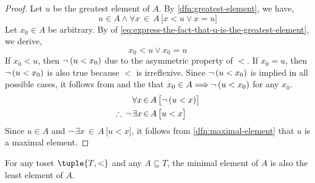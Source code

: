 \begin{proof}
    Let \( u \) be the greatest element of \( A \). By \cref{dfn:greatest-element}, we have,
    \begin{equation}
        \label{eq:express-the-fact-that-u-is-the-greatest-element}
        u \in A \land \forall x\,{\in}\,A \, \big[ x < u \lor x = u \big]
    \end{equation}
    Let \( x_{0} \in A \) be arbitrary. By  of \eqref{eq:express-the-fact-that-u-is-the-greatest-element}, we derive,
    \begin{equation*}
        x_{0} < u \lor x_{0} = u
    \end{equation*}
    If \( x_{0} < u \), then \( \lnot \, \mleft( u < x_{0} \mright) \) due to the asymmetric property of \( < \). If \( x_{0} = u \), then
    \( \lnot \, \mleft( u < x_{0} \mright) \) is also true because \( < \) is irreflexive. Since \( \lnot \, \mleft( u < x_{0} \mright) \)
    is implied in all possible cases, it follows from  and the  that
    \( x_{0} \in A {\implies} \lnot \, \mleft( u < x_{0} \mright) \) for any \( x_{0} \).
    \begin{align*}
        &\forall x\,{\in}\,A \, \big[ \lnot \, \mleft( u < x \mright) \big]\\
        \therefore \, \lnot \, &\exists x\,{\in}\,A \, \big[ u < x \big]
    \end{align*}
    Since \( u \in A \) and \( \lnot \, \exists x\,{\in}\,A \, \big[ u < x \big] \), it follows from \cref{dfn:maximal-element} that
    \( u \) is a maximal element.
\end{proof}

\begin{thm}
    \label{thm:minimal-element-is-the-least-element-for-tosets}
    For any toset \( \tuple{T, <} \) and any \( A \subseteq T \), the minimal element of \( A \) is also the least element of \( A \).
\end{thm}

